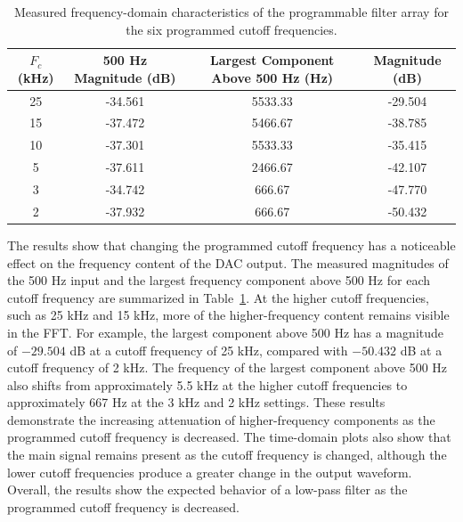 \begin{table}[H]
\renewcommand{\arraystretch}{1.3}
\caption{Measured frequency-domain characteristics of the programmable filter array for the six programmed cutoff frequencies.}
\label{tab:programmable_filter_results}

\centering
\begin{tabular}{||c|c|c|c||}
\hline
$F_c$ (kHz) &
500 Hz Magnitude (dB) &
Largest Component Above 500 Hz (Hz) &
Magnitude (dB) \\ \hline

25 &
-34.561 &
5533.33 &
-29.504 \\ \hline

15 &
-37.472 &
5466.67 &
-38.785 \\ \hline

10 &
-37.301 &
5533.33 &
-35.415 \\ \hline

5 &
-37.611 &
2466.67 &
-42.107 \\ \hline

3 &
-34.742 &
666.67 &
-47.770 \\ \hline

2 &
-37.932 &
666.67 &
-50.432 \\ \hline

\end{tabular}
\end{table}

The results show that changing the programmed cutoff frequency has a noticeable effect on the frequency content of the DAC output. The measured magnitudes of the 500 Hz input and the largest frequency component above 500 Hz for each cutoff frequency are summarized in Table~\ref{tab:programmable_filter_results}. At the higher cutoff frequencies, such as 25 kHz and 15 kHz, more of the higher-frequency content remains visible in the FFT. For example, the largest component above 500 Hz has a magnitude of $-29.504$ dB at a cutoff frequency of 25 kHz, compared with $-50.432$ dB at a cutoff frequency of 2 kHz. The frequency of the largest component above 500 Hz also shifts from approximately 5.5 kHz at the higher cutoff frequencies to approximately 667 Hz at the 3 kHz and 2 kHz settings. These results demonstrate the increasing attenuation of higher-frequency components as the programmed cutoff frequency is decreased. The time-domain plots also show that the main signal remains present as the cutoff frequency is changed, although the lower cutoff frequencies produce a greater change in the output waveform. Overall, the results show the expected behavior of a low-pass filter as the programmed cutoff frequency is decreased.



